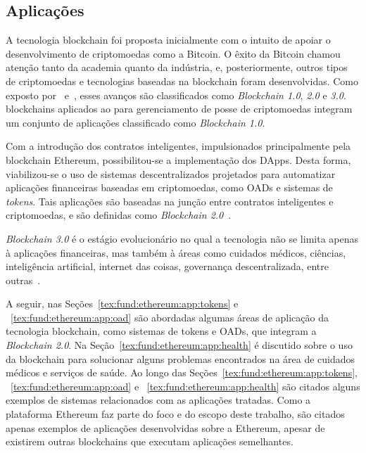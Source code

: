 \subsection{Aplicações} \label{tex:fund:ethereum:aplica}

A tecnologia blockchain foi proposta inicialmente com o intuito de apoiar o desenvolvimento de criptomoedas como a Bitcoin. O êxito da Bitcoin chamou atenção tanto da academia quanto da indústria, e, posteriormente, outros tipos de criptomoedas e tecnologias baseadas na blockchain foram desenvolvidas. Como exposto por~\cite{swan2015blockchain-book} e~\cite{maesa2020blockchain3.0}, esses avanços são classificados como \textit{Blockchain 1.0}, \textit{2.0} e \textit{3.0}. blockchains aplicados ao para gerenciamento de posse de criptomoedas integram um conjunto de aplicações classificado como \textit{Blockchain 1.0}. 

Com a introdução dos contratos inteligentes, impulsionados principalmente pela blockchain Ethereum, possibilitou-se a implementação dos DApps. Desta forma, viabilizou-se o uso de sistemas descentralizados projetados para automatizar aplicações financeiras baseadas em criptomoedas, como OADs e sistemas de \textit{tokens}. Tais aplicações são baseadas na junção entre contratos inteligentes e criptomoedas, e são definidas como \textit{Blockchain 2.0}~\cite{maesa2020blockchain3.0}.

\textit{Blockchain 3.0} é o estágio evolucionário no qual a tecnologia não se limita apenas à aplicações financeiras, mas também à áreas como cuidados médicos, ciências, inteligência artificial, internet das coisas, governança descentralizada, entre outras~\cite{maesa2020blockchain3.0}. 

A seguir, nas Seções~\ref{tex:fund:ethereum:app:tokens} e ~\ref{tex:fund:ethereum:app:oad} são abordadas algumas áreas de aplicação da tecnologia blockchain, como sistemas de tokens e OADs, que integram a \textit{Blockchain 2.0}. Na Seção~\ref{tex:fund:ethereum:app:health} é discutido sobre o uso da blockchain para solucionar alguns problemas encontrados na área de cuidados médicos e serviços de saúde. Ao longo das Seções~\ref{tex:fund:ethereum:app:tokens}, ~\ref{tex:fund:ethereum:app:oad} e ~\ref{tex:fund:ethereum:app:health} são citados alguns exemplos de sistemas relacionados com as aplicações tratadas. Como a plataforma Ethereum faz parte do foco e do escopo deste trabalho, são citados apenas exemplos de aplicações desenvolvidas sobre a Ethereum, apesar de existirem outras blockchains que executam aplicações semelhantes.

